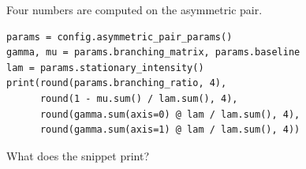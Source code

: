 \begin{question}
\label{question.endogenousFractionWeighsTheColumnSums}
Four numbers are computed on the asymmetric pair.
\begin{lstlisting}[caption={The branching ratio, the endogenous fraction, and two weighted sums}, label=listing.endogenousFractionWeighsTheColumnSums]
params = config.asymmetric_pair_params()
gamma, mu = params.branching_matrix, params.baseline
lam = params.stationary_intensity()
print(round(params.branching_ratio, 4),
      round(1 - mu.sum() / lam.sum(), 4),
      round(gamma.sum(axis=0) @ lam / lam.sum(), 4),
      round(gamma.sum(axis=1) @ lam / lam.sum(), 4))
\end{lstlisting}
What does the snippet print?
\begin{choices}
 \choice {}
 \choice {}
 \correctchoice {}
 \choice {}
 \choice {}
\end{choices}
\end{question}


